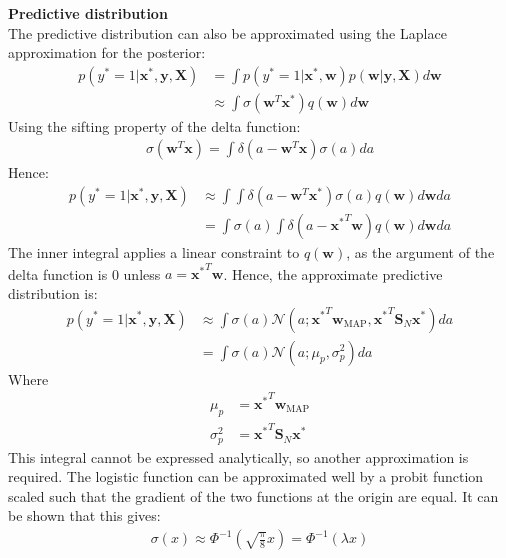 \documentclass[a4paper]{article}
\begin{document}
    \vspace{\baselineskip}
    \noindent\textbf{Predictive distribution} \\
    The predictive distribution can also be approximated using the Laplace approximation for the posterior:
    \begin{align}
        p(y^* = 1 | \bm{x}^*, \bm{y}, \bm{X}) &= \int p(y^* = 1 | \bm{x}^*, \bm{w}) p(\bm{w} | \bm{y}, \bm{X}) d\bm{w} \nonumber \\
        & \approx \int \sigma(\bm{w}^T\bm{x}^*) q(\bm{w}) d\bm{w} \nonumber
    \end{align}
    Using the sifting property of the delta function:
    \begin{align}
        \sigma(\bm{w}^T \bm{x}) = \int \delta(a - \bm{w}^T \bm{x}) \sigma(a) da \nonumber
    \end{align}
    Hence:
     \begin{align}
        p(y^* = 1 | \bm{x}^*, \bm{y}, \bm{X}) &\approx \int \int \delta(a - \bm{w}^T \bm{x}^*) \sigma(a) q(\bm{w}) d\bm{w} da \nonumber \\
         &= \int \sigma(a) \int \delta(a - {\bm{x}^*}^T \bm{w}) q(\bm{w}) d\bm{w} da \nonumber
    \end{align}
    The inner integral applies a linear constraint to $q(\bm{w})$, as the argument of the delta function is 0 unless $a = {\bm{x}^*}^T \bm{w}$.
    Hence, the approximate predictive distribution is:
    \begin{align}
        \label{eq:intermediate-approx-predictive}
         p(y^* = 1 | \bm{x}^*, \bm{y}, \bm{X}) &\approx \int \sigma(a) \mathcal{N}(a; {\bm{x}^*}^T \bm{w}_\text{MAP}, {\bm{x}^*}^T \bm{S}_N \bm{x^*}) da \nonumber \\
        &= \int \sigma(a) \mathcal{N}(a; \mu_p, \sigma_p^2) da
     \end{align}
    Where
    \begin{align*}
        \mu_p &= {\bm{x}^*}^T \bm{w}_\text{MAP}\\
        \sigma_p^2 &= {\bm{x}^*}^T \bm{S}_N \bm{x^*}
    \end{align*}
    This integral cannot be expressed analytically, so another approximation is required.
    The logistic function can be approximated well by a probit function scaled such that the gradient of the two functions at the origin are equal.
    It can be shown that this gives:
    \begin{align}
        \label{eq:probit-approximation}
        \sigma(x) \approx \Phi^{-1}\left(\sqrt{\frac{\pi}{8}} x\right) = \Phi^{-1}(\lambda x)
    \end{align}
\end{document}
